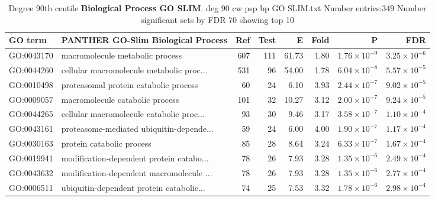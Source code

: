 \begin{table}[ht]
\centering
\begin{adjustbox}{width=\textwidth}

\begin{tabular}{llrrrrrr}
  \hline
GO term & PANTHER GO-Slim Biological Process & Ref & Test & E & Fold & P & FDR \\ 
  \hline
GO:0043170 & macromolecule metabolic process  & 607 & 111 & 61.73 & 1.80 & $1.76 \times 10^{-9}$ & $3.25 \times 10^{-6}$ \\ 
  GO:0044260 & cellular macromolecule metabolic proc... & 531 & 96 & 54.00 & 1.78 & $6.04 \times 10^{-8}$ & $5.57 \times 10^{-5}$ \\ 
  GO:0010498 & proteasomal protein catabolic process  & 60 & 24 & 6.10 & 3.93 & $2.44 \times 10^{-7}$ & $9.02 \times 10^{-5}$ \\ 
  GO:0009057 & macromolecule catabolic process  & 101 & 32 & 10.27 & 3.12 & $2.00 \times 10^{-7}$ & $9.24 \times 10^{-5}$ \\ 
  GO:0044265 & cellular macromolecule catabolic proc... & 93 & 30 & 9.46 & 3.17 & $3.58 \times 10^{-7}$ & $1.10 \times 10^{-4}$ \\ 
  GO:0043161 & proteasome-mediated ubiquitin-depende... & 59 & 24 & 6.00 & 4.00 & $1.90 \times 10^{-7}$ & $1.17 \times 10^{-4}$ \\ 
  GO:0030163 & protein catabolic process  & 85 & 28 & 8.64 & 3.24 & $6.33 \times 10^{-7}$ & $1.67 \times 10^{-4}$ \\ 
  GO:0019941 & modification-dependent protein catabo... & 78 & 26 & 7.93 & 3.28 & $1.35 \times 10^{-6}$ & $2.49 \times 10^{-4}$ \\ 
  GO:0043632 & modification-dependent macromolecule ... & 78 & 26 & 7.93 & 3.28 & $1.35 \times 10^{-6}$ & $2.77 \times 10^{-4}$ \\ 
  GO:0006511 & ubiquitin-dependent protein catabolic... & 74 & 25 & 7.53 & 3.32 & $1.78 \times 10^{-6}$ & $2.98 \times 10^{-4}$ \\ 
  \hline
\end{tabular}
\end{adjustbox}
\caption{Degree 90th centile \textbf{Biological Process GO SLIM}. deg 90 cw psp bp GO SLIM.txt Number entries:349 Number significant sets by FDR 70 showing top 10} 
\label{tab:deg 90 cw psp bp GO SLIM.txt Number entries:349 Number significant sets by FDR 70 showing top 10}
\end{table}



